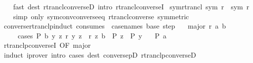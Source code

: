 \begin{isabellebody}
%
\isadelimproof
\ \ %
\endisadelimproof
%
\isatagproof
{}\isamarkupfalse%
\ {\isacharparenleft}{\kern0pt}fast\ dest{\isacharbang}{\kern0pt}{\isacharcolon}{\kern0pt}\ rtrancl{\isacharunderscore}{\kern0pt}converseD\ intro{\isacharbang}{\kern0pt}{\isacharcolon}{\kern0pt}\ rtrancl{\isacharunderscore}{\kern0pt}converseI{\isacharparenright}{\kern0pt}%
\endisatagproof
{\isafoldproof}%
%
\isadelimproof
\isanewline
%
\endisadelimproof
\isanewline
{}\isamarkupfalse%
\ sym{\isacharunderscore}{\kern0pt}rtrancl{\isacharcolon}{\kern0pt}\ {\isachardoublequoteopen}sym\ r\ {\isasymLongrightarrow}\ sym\ {\isacharparenleft}{\kern0pt}r\isactrlsup {\isacharasterisk}{\kern0pt}{\isacharparenright}{\kern0pt}{\isachardoublequoteclose}\isanewline
%
\isadelimproof
\ \ %
\endisadelimproof
%
\isatagproof
{}\isamarkupfalse%
\ {\isacharparenleft}{\kern0pt}simp\ only{\isacharcolon}{\kern0pt}\ sym{\isacharunderscore}{\kern0pt}conv{\isacharunderscore}{\kern0pt}converse{\isacharunderscore}{\kern0pt}eq\ rtrancl{\isacharunderscore}{\kern0pt}converse\ {\isacharbrackleft}{\kern0pt}symmetric{\isacharbrackright}{\kern0pt}{\isacharparenright}{\kern0pt}%
\endisatagproof
{\isafoldproof}%
%
\isadelimproof
\isanewline
%
\endisadelimproof
\isanewline
{}\isamarkupfalse%
\ converse{\isacharunderscore}{\kern0pt}rtranclp{\isacharunderscore}{\kern0pt}induct\ {\isacharbrackleft}{\kern0pt}consumes\ {}{\isacharcomma}{\kern0pt}\ case{\isacharunderscore}{\kern0pt}names\ base\ step{\isacharbrackright}{\kern0pt}{\isacharcolon}{\kern0pt}\isanewline
\ \ \ major{\isacharcolon}{\kern0pt}\ {\isachardoublequoteopen}r\isactrlsup {\isacharasterisk}{\kern0pt}\isactrlsup {\isacharasterisk}{\kern0pt}\ a\ b{\isachardoublequoteclose}\isanewline
\ \ \ \ \ cases{\isacharcolon}{\kern0pt}\ {\isachardoublequoteopen}P\ b{\isachardoublequoteclose}\ {\isachardoublequoteopen}{\isasymAnd}y\ z{\isachardot}{\kern0pt}\ r\ y\ z\ {\isasymLongrightarrow}\ r\isactrlsup {\isacharasterisk}{\kern0pt}\isactrlsup {\isacharasterisk}{\kern0pt}\ z\ b\ {\isasymLongrightarrow}\ P\ z\ {\isasymLongrightarrow}\ P\ y{\isachardoublequoteclose}\isanewline
\ \ \ {\isachardoublequoteopen}P\ a{\isachardoublequoteclose}\isanewline
%
\isadelimproof
\ \ %
\endisadelimproof
%
\isatagproof
{}\isamarkupfalse%
\ rtranclp{\isacharunderscore}{\kern0pt}converseI\ {\isacharbrackleft}{\kern0pt}OF\ major{\isacharbrackright}{\kern0pt}\isanewline
\ \ \isamarkupfalse%
\ induct\ {\isacharparenleft}{\kern0pt}iprover\ intro{\isacharcolon}{\kern0pt}\ cases\ dest{\isacharbang}{\kern0pt}{\isacharcolon}{\kern0pt}\ conversepD\ rtranclp{\isacharunderscore}{\kern0pt}converseD{\isacharparenright}{\kern0pt}{\isacharplus}{\kern0pt}%

\end{isabellebody}
